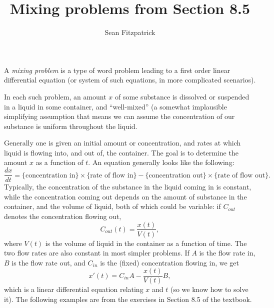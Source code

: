 \documentclass[12pt,letterpaper]{article}
\title{Mixing problems from Section 8.5}
\author{Sean Fitzpatrick}
\begin{document}
\maketitle

A \textit{mixing problem} is a type of word problem leading to a first order linear differential equation (or system of such equations, in more complicated scenarios).

In each such problem, an amount $x$ of some substance is dissolved or suspended in a liquid in some container, and ``well-mixed'' (a somewhat implausible simplifying assumption that means we can assume the concentration of our substance is uniform throughout the liquid.

Generally one is given an initial amount or concentration, and rates at which liquid is flowing into, and out of, the container. The goal is to determine the amount $x$ as a function of $t$. An equation generally looks like the following:
\[
\frac{dx}{dt} = \{\text{concentration in}\}\times\{\text{rate of flow in}\} - \{\text{concentration out}\}\times\{\text{rate of flow out}\}.
\]
Typically, the concentration of the substance in the liquid coming in is constant, while the concentration coming out depends on the amount of substance in the container, and the volume of liquid, both of which could be variable: if $C_{out}$ denotes the concentration flowing out,
\[
C_{out}(t) = \frac{x(t)}{V(t)},
\]
where $V(t)$ is the volume of liquid in the container as a function of time. The two flow rates are also constant in most simpler problems. If $A$ is the flow rate in, $B$ is the flow rate out, and $C_{in}$ is the (fixed) concentration flowing in, we get
\[
x'(t)=C_{in}A-\frac{x(t)}{V(t)}B,
\]
which is a linear differential equation relating $x$ and $t$ (so we know how to solve it). The following examples are from the exercises in Section 8.5 of the textbook.

\newpage
\end{document}
